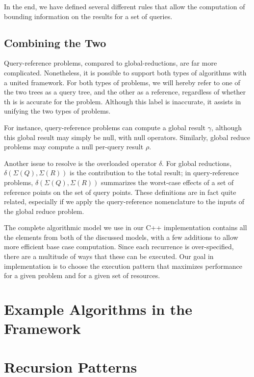 \documentclass[times, 10pt,twocolumn]{article}
\newcommand{\outrho}{\rho}
\newcommand{\outstat}{\Sigma}
\begin{document}
\noindent In the end, we have defined several different rules that allow the computation of bounding information on the results for a set of queries.


\subsection{Combining the Two}

Query-reference problems, compared to global-reductions, are far more complicated.
Nonetheless, it is possible to support both types of algorithms with a united framework.
For both types of problems, we will hereby refer to one of the two trees as a query tree, and the other as a reference, regardless of whether th is is accurate for the problem.
Although this label is inaccurate, it assists in unifying the two types of problems.

For instance, query-reference problems can compute a global result $\gamma$, although this global result may simply be null, with null operators.
Similarly, global reduce problems may compute a null per-query result $\outrho$.

Another issue to resolve is the overloaded operator $\delta$.
For global reductions, $\delta(\outstat(Q), \outstat(R))$ is the contribution to the total result; in query-reference problems, $\delta(\outstat(Q), \outstat(R))$ summarizes the worst-case effects of a set of reference points on the set of query points.
These definitions are in fact quite related, especially if we apply the query-reference nomenclature to the inputs of the global reduce problem.

The complete algorithmic model we use in our C++ implementation contains all the elements from both of the discussed models, with a few additions to allow more efficient base case computation.
Since each recurrence is over-specified, there are a multitude of ways that these can be executed.
Our goal in implementation is to choose the execution pattern that maximizes performance for a given problem and for a given set of resources.

\section{Example Algorithms in the Framework}

\section{Recursion Patterns}
\end{document}
